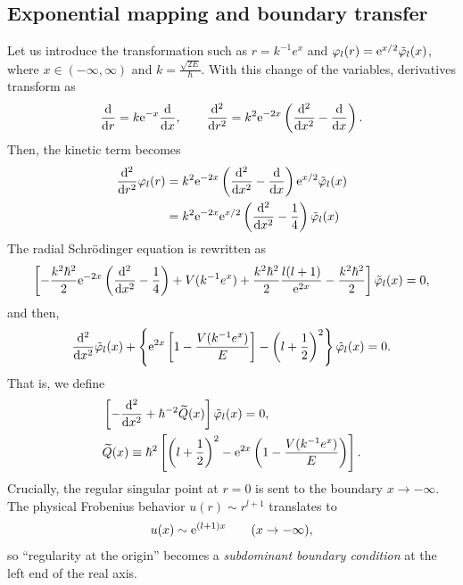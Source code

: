 \subsection{Exponential mapping and boundary transfer}\label{src:2510_11766:sec:rx-mapping}
Let us introduce the transformation such as $r=k^{-1}e^x$ and $\varphi_l(r)=\mathrm{e}^{x/2}\Tilde{\varphi}_l(x)$, where $x\in(-\infty,\infty)$ and $k=\frac{\sqrt{2E}}{\hbar}$.
With this change of the variables, derivatives transform as
\begin{align}
    \frac{\mathrm{d}}{\mathrm{d} r} = k \mathrm{e}^{-x}\frac{\mathrm{d}}{\mathrm{d} x},\qquad 
    \frac{\mathrm{d}^2}{\mathrm{d} r^2} = k^2 \mathrm{e}^{-2x} \left(\frac{\mathrm{d}^2}{\mathrm{d} x^2}-\frac{\mathrm{d}}{\mathrm{d} x}\right).
\end{align}
Then, the kinetic term becomes
\begin{align}
    \frac{\mathrm{d}^2}{\mathrm{d} r^2} \varphi_l(r)
    &= k^2 \mathrm{e}^{-2x} \left(\frac{\mathrm{d}^2}{\mathrm{d} x^2}-\frac{\mathrm{d}}{\mathrm{d} x}\right) \mathrm{e}^{x/2} \Tilde{\varphi}_l(x)
    \\ 
    &= k^2 \mathrm{e}^{-2x} \mathrm{e}^{x/2} \left(\frac{\mathrm{d}^2}{\mathrm{d} x^2}-\frac{1}{4}\right) \Tilde{\varphi}_l(x) 
\end{align}
The radial Schr\"odinger equation is rewritten as
\begin{align}
    \left[ - \frac{k^2\hbar^2}{2} \mathrm{e}^{-2x}\left(\frac{\mathrm{d}^2}{\mathrm{d} x^2}-\frac{1}{4}\right) + V(k^{-1}e^x) + \frac{k^2\hbar^2}{2}\frac{l(l+1)}{\mathrm{e}^{2x}} - \frac{k^2\hbar^2}{2}\right] \Tilde{\varphi}_l(x) = 0 ,
\end{align}
and then,
\begin{align}
    \frac{\mathrm{d}^2}{\mathrm{d} x^2}\Tilde{\varphi}_l(x) + \left\{\mathrm{e}^{2x}\left[1-\frac{V(k^{-1}e^x)}{E}\right]-\left(l+\frac{1}{2}\right)^2\right\}\Tilde{\varphi}_l(x)=0 .
\end{align}
That is, we define
\begin{align}
    &\left[-\frac{\mathrm{d}^2}{\mathrm{d} x^2} + \hbar^{-2}\widetilde{Q}(x)\right]\tilde{\varphi}_l(x)=0 , \\
    &\widetilde{Q}(x)\equiv\hbar^2 \left[\left(l+\frac{1}{2}\right)^2-\mathrm{e}^{2x}\left(1-\frac{V(k^{-1}e^x)}{E}\right)\right] .
\end{align}
Crucially, the regular singular point at \(r=0\) is sent to the boundary $x\to-\infty$.
The physical Frobenius behavior $u(r)\sim r^{l+1}$ translates to
\begin{align}
    u(x)\sim \mathrm{e}^{(l+1)x}\qquad (x\to-\infty),
\end{align}
so ``regularity at the origin'' becomes a \textit{subdominant boundary condition} at the left end of the real axis.
